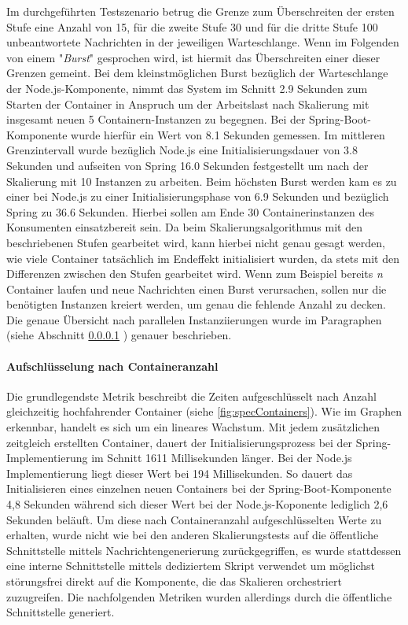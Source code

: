 Im durchgeführten Testszenario betrug die Grenze zum Überschreiten der ersten Stufe eine Anzahl von 15, für die zweite Stufe 30 und für die dritte Stufe 100 unbeantwortete Nachrichten in der jeweiligen Warteschlange. Wenn im Folgenden von einem "\emph{Burst}" gesprochen wird, ist hiermit das Überschreiten einer dieser Grenzen gemeint. Bei dem kleinstmöglichen Burst bezüglich der Warteschlange der Node.js-Komponente, nimmt das System im Schnitt 2.9 Sekunden zum Starten der Container in Anspruch um der Arbeitslast nach Skalierung mit insgesamt neuen 5 Containern-Instanzen zu begegnen. Bei der Spring-Boot-Komponente wurde hierfür ein Wert von 8.1 Sekunden gemessen. Im mittleren Grenzintervall wurde bezüglich Node.js eine Initialisierungsdauer von 3.8 Sekunden und aufseiten von Spring 16.0 Sekunden festgestellt um nach der Skalierung mit 10 Instanzen zu arbeiten. Beim höchsten Burst werden kam es zu einer bei Node.js zu einer Initialisierungsphase von 6.9 Sekunden und bezüglich Spring zu 36.6 Sekunden. Hierbei sollen am Ende 30 Containerinstanzen des Konsumenten einsatzbereit sein. Da beim Skalierungsalgorithmus mit den beschriebenen Stufen gearbeitet wird, kann hierbei nicht genau gesagt werden, wie viele Container tatsächlich im Endeffekt initialisiert wurden, da stets mit den Differenzen zwischen den Stufen gearbeitet wird. Wenn zum Beispiel bereits \emph{n} Container laufen und neue Nachrichten einen Burst verursachen, sollen nur die benötigten Instanzen kreiert werden, um genau die fehlende Anzahl zu decken. Die genaue Übersicht nach parallelen Instanziierungen wurde im Paragraphen (siehe Abschnitt \ref{par:specContainer} ) genauer beschrieben.


\paragraph{Aufschlüsselung nach Containeranzahl \checkmark}
\label{par:specContainer}
Die grundlegendste Metrik beschreibt die Zeiten aufgeschlüsselt nach Anzahl gleichzeitig hochfahrender Container (siehe \ref{fig:specContainers}). Wie im Graphen erkennbar, handelt es sich um ein lineares Wachstum. Mit jedem zusätzlichen zeitgleich erstellten Container, dauert der Initialisierungsprozess bei der Spring-Implementierung im Schnitt 1611 Millisekunden länger. Bei der Node.js Implementierung liegt dieser Wert bei 194 Millisekunden. So dauert das Initialisieren eines einzelnen neuen Containers bei der Spring-Boot-Komponente 4,8 Sekunden während sich dieser Wert bei der Node.js-Koponente lediglich 2,6 Sekunden beläuft. Um diese nach Containeranzahl aufgeschlüsselten Werte zu erhalten, wurde nicht wie bei den anderen Skalierungstests auf die öffentliche Schnittstelle mittels Nachrichtengenerierung zurückgegriffen, es wurde stattdessen eine interne Schnittstelle mittels dediziertem Skript verwendet um möglichst störungsfrei direkt auf die Komponente, die das Skalieren orchestriert zuzugreifen. Die nachfolgenden Metriken wurden allerdings durch die öffentliche Schnittstelle generiert.

